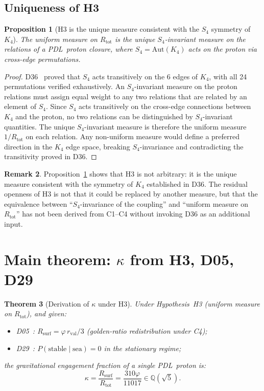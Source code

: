 \documentclass[11pt,a4paper]{article}
\newtheorem{theorem}{Theorem}[section]
\newtheorem{proposition}[theorem]{Proposition}
\theoremstyle{definition}
\newtheorem{remark}[theorem]{Remark}
\newcommand{\PDL}{\textnormal{PDL}}
\newcommand{\Kfour}{K_4}
\newcommand{\rval}{r_{\mathrm{val}}}
\newcommand{\Rtot}{R_{\mathrm{tot}}}
\newcommand{\Rsurf}{R_{\mathrm{surf}}}
\newcommand{\vp}{\varphi}
\newcommand{\kap}{\kappa}
\begin{document}
\subsection{Uniqueness of H3}

\begin{proposition}[H3 is the unique measure consistent with the
$S_4$ symmetry of $\Kfour$]
\label{prop:unique}
The uniform measure on $\Rtot$ is the unique $S_4$-invariant measure
on the relations of a \PDL\ proton closure, where $S_4 =
\mathrm{Aut}(\Kfour)$ acts on the proton via cross-edge permutations.
\end{proposition}

\begin{proof}
D36~\cite{PDL_D36_2026} proved that $S_4$ acts transitively on the
6 edges of $\Kfour$, with all 24 permutations verified exhaustively.
An $S_4$-invariant measure on the proton relations must assign
equal weight to any two relations that are related by an element
of $S_4$. Since $S_4$ acts transitively on the cross-edge connections
between $\Kfour$ and the proton, no two relations can be distinguished
by $S_4$-invariant quantities. The unique $S_4$-invariant measure is
therefore the uniform measure $1/\Rtot$ on each relation. Any
non-uniform measure would define a preferred direction in the
$\Kfour$ edge space, breaking $S_4$-invariance and contradicting
the transitivity proved in D36.
\end{proof}

\begin{remark}
Proposition~\ref{prop:unique} shows that H3 is not arbitrary: it is
the unique measure consistent with the symmetry of $\Kfour$ established
in D36. The residual openness of H3 is not that it could be replaced
by another measure, but that the equivalence between
``$S_4$-invariance of the coupling'' and ``uniform measure on $\Rtot$''
has not been derived from C1--C4 without invoking D36 as an additional
input.
\end{remark}

\section{Main theorem: \texorpdfstring{$\kap$}{kappa} from H3, D05, D29}
\label{sec:proof}

\begin{theorem}[Derivation of $\kap$ under H3]
\label{thm:kappa}
Under Hypothesis~H3 (uniform measure on $\Rtot$), and given:
\begin{itemize}
\item D05~\cite{PDL_Main_2026}: $\Rsurf = \vp\,\rval/3$
  (golden-ratio redistribution under C4);
\item D29~\cite{PDL_D29_2026}: $P(\mathrm{stable}\mid\mathrm{sea}) = 0$
  in the stationary regime;
\end{itemize}
the gravitational engagement fraction of a single \PDL\ proton is:
\begin{equation}
\kap = \frac{\Rsurf}{\Rtot} = \frac{310\vp}{11017} \in \mathbb{Q}(\sqrt{5}).
\label{eq:kappa_theorem}
\end{equation}
\end{theorem}
\end{document}
